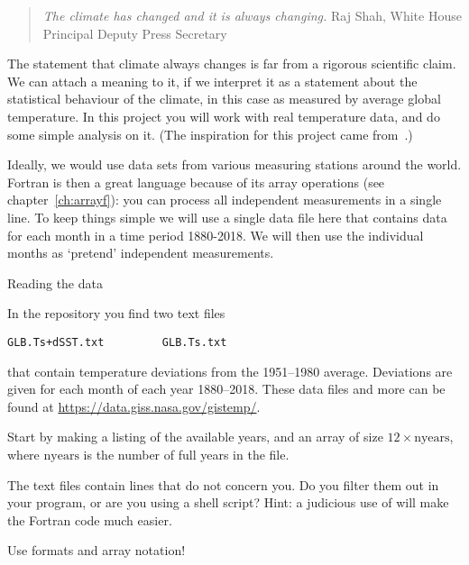 
\begin{quotation}
  \noindent
  \textsl{The climate has changed and it is always changing.}
  \hfill\break\hbox{}\hfill Raj Shah, White House Principal Deputy Press Secretary\par
\end{quotation}

The statement that climate always changes is far from a rigorous
scientific claim.  We can attach a meaning to it, if we interpret it
as a statement about the statistical behaviour of the climate, in this
case as measured by average global temperature.  In this project you
will work with real temperature data, and do some simple analysis on
it. (The inspiration for this project came
from~\cite{ManRestrepo:climatechange}.)

Ideally, we would use data sets from various measuring stations around
the world. Fortran is then a great language because of its array
operations (see chapter~\ref{ch:arrayf}): you can process all
independent measurements in a single line. To keep things simple we
will use a single data file here that contains data for each month in
a time period 1880-2018. We will then use the individual months as
`pretend' independent measurements.

 {Reading the data}

In the repository you find two text files
\begin{verbatim}
GLB.Ts+dSST.txt         GLB.Ts.txt
\end{verbatim}
that contain temperature deviations from the 1951--1980 average.
Deviations are given for each month of each year 1880--2018. These
data files and more can be found at
\url{https://data.giss.nasa.gov/gistemp/}.

\begin{exercise}
  Start by making a listing of the available years, and an array
   of size $12\times\mathrm{nyears}$, where
  $\mathrm{nyears}$ is the number of full years in the file.

  The text files contain lines that do not concern you. Do you filter
  them out in your program, or are you using a shell script? Hint: a
  judicious use of  will make the Fortran code much easier.

  Use formats and array notation!
\end{exercise}

